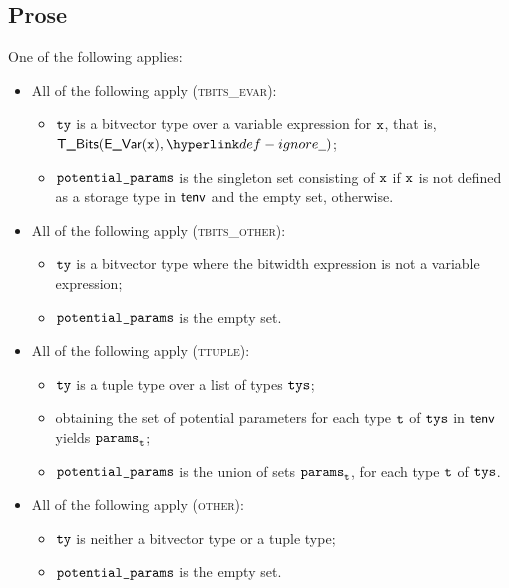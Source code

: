 \documentclass{book}
\begin{document}
\subsection{Prose}
One of the following applies:
\begin{itemize}
  \item All of the following apply (\textsc{tbits\_evar}):
  \begin{itemize}
    \item $\texttt{ty}$ is a bitvector type over a variable expression for $\texttt{x}$, that is, \\ $\TBits(\EVar(\vx), \Ignore)$;
    \item $\texttt{potential\_params}$ is the singleton set consisting of $\texttt{x}$ if $\texttt{x}$ is not defined as a storage type in $\textsf{tenv}$
          and the empty set, otherwise.
  \end{itemize}

  \item All of the following apply (\textsc{tbits\_other}):
  \begin{itemize}
    \item $\texttt{ty}$ is a bitvector type where the bitwidth expression is not a variable expression;
    \item $\texttt{potential\_params}$ is the empty set.
  \end{itemize}

  \item All of the following apply (\textsc{ttuple}):
  \begin{itemize}
    \item $\texttt{ty}$ is a tuple type over a list of types $\texttt{tys}$;
    \item obtaining the set of potential parameters for each type $\texttt{t}$ of $\texttt{tys}$ in $\textsf{tenv}$ yields $\texttt{params}_{\texttt{t}}$;
    \item $\texttt{potential\_params}$ is the union of sets $\texttt{params}_{\texttt{t}}$, for each type $\texttt{t}$ of $\texttt{tys}$.
  \end{itemize}

  \item All of the following apply (\textsc{other}):
  \begin{itemize}
    \item $\texttt{ty}$ is neither a bitvector type or a tuple type;
    \item $\texttt{potential\_params}$ is the empty set.
  \end{itemize}
\end{itemize}
\end{document}
